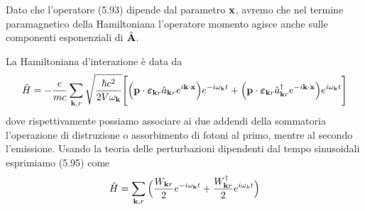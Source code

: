 Dato che l'operatore (5.93) dipende dal parametro $\bold{x}$, avremo che nel termine paramagnetico della Hamiltoniana l'operatore momento agisce anche sulle componenti esponenziali di $\hat{\bold{A}}$.

La Hamiltoniana d'interazione \`e data da
\begin{equation}
	\hat{H} = - \frac{e}{mc} \sum_{\bold{k},r} \sqrt{\frac{\hbar c^2}{2V\omega_{\bold{k}}}}\Bigg[\Big(\bold{p} \cdot \boldsymbol{\varepsilon}_{\bold{k}r}\hat{a}_{\bold{k}r}e^{i \bold{k}\cdot \bold{x}}\Big)e^{-i\omega_{\bold{k}}t}+\Big(\bold{p} \cdot \boldsymbol{\varepsilon}_{\bold{k}r}\hat{a}_{\bold{k}r}^{\dag}e^{-i\bold{k} \cdot \bold{x}}\Big)e^{i \omega_{\bold{k}}t} \Bigg ]
\end{equation} 
dove rispettivamente possiamo associare ai due addendi della sommatoria l'operazione di distruzione o assorbimento di fotoni al primo, mentre al secondo l'emissione.
Usando la teoria delle perturbazioni dipendenti dal tempo sinusoidali esprimiamo (5.95) come
\begin{equation}
	\hat{H} = \sum_{\bold{k},r} \Big( \frac{W_{\bold{k}r}}{2}e^{-i\omega_{\bold{k}}t} + \frac{W_{\bold{k}r}^\dag}{2}e^{i \omega_{k}t} \Big)
\end{equation}

\newpage
